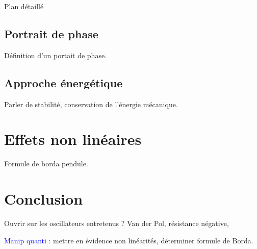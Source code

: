 \begin{reportBlock}{Plan détaillé}
  \subsection{Portrait de phase}
  Définition d'un portait de phase.
  \subsection{Approche énergétique}
  Parler de stabilité, conservation de l'énergie mécanique.

  

  \section{Effets non linéaires}
  Formule de borda pendule.\\

  \section*{Conclusion}
  Ouvrir sur les oscillateurs entretenus ? Van der Pol, résistance négative,

  \textcolor{blue}{Manip quanti :} mettre en évidence non linéarités, déterminer formule de Borda.
  


\end{reportBlock}